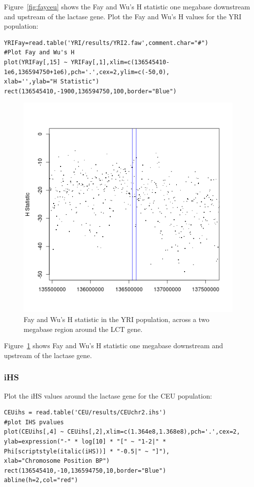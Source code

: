 \documentclass[a4paper,10pt]{article}
\begin{document}
\noindent
Figure~\ref{fig:fayceu} shows the Fay and Wu's H statistic one
megabase downstream and upstream of the lactase gene.  Plot the Fay
and Wu's H values for the YRI population:\\
\begin{verbatim}
YRIFay=read.table('YRI/results/YRI2.faw',comment.char="#")
#Plot Fay and Wu's H
plot(YRIFay[,15] ~ YRIFay[,1],xlim=c(136545410-1e6,136594750+1e6),pch='.',cex=2,ylim=c(-50,0),
xlab='',ylab="H Statistic")
rect(136545410,-1900,136594750,100,border="Blue") 
\end{verbatim}
\begin{figure}
\centering
\includegraphics{pictures/YRIFay.png}
\caption{Fay and Wu's H statistic in the YRI population, across a two
  megabase region around the LCT gene.} 
\label{fig:fayyri}
\end{figure}

\noindent
Figure~\ref{fig:fayyri} shows Fay and Wu's H statistic one megabase
downstream and upstream of the lactase gene.

\subsubsection{iHS}
Plot the iHS values around the lactase gene for the CEU population:\\
\begin{verbatim}
CEUihs = read.table('CEU/results/CEUchr2.ihs')
#plot IHS pvalues
plot(CEUihs[,4] ~ CEUihs[,2],xlim=c(1.364e8,1.368e8),pch='.',cex=2,
ylab=expression("-" * log[10] * "[" ~ "1-2|" * Phi[scriptstyle(italic(iHS))] * "-0.5|" ~ "]"),
xlab="Chromosome Position BP") 
rect(136545410,-10,136594750,10,border="Blue") 
abline(h=2,col="red")
\end{verbatim}
\end{document}
